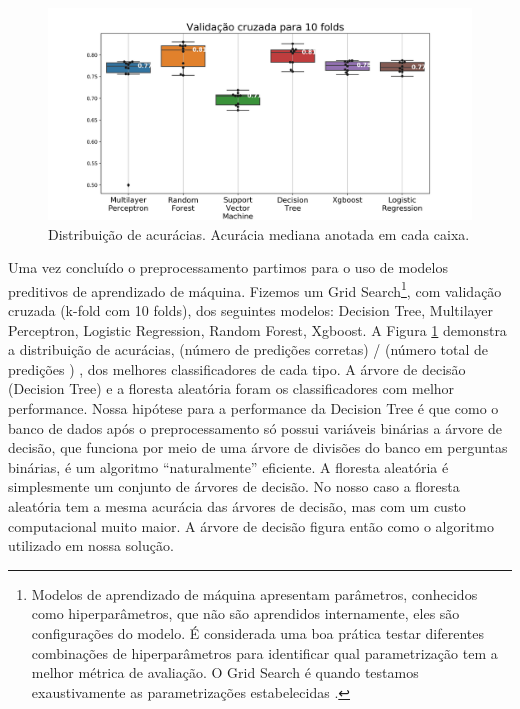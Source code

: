 \documentclass[
	12pt,				%
	openany,			%
	oneside,			%
	a4paper,			%
	english,			%
	french,				%
	spanish,			%
	brazil,				%
	]{abntex2}
\begin{document}
\begin{figure}[H]
  \includegraphics[scale=0.5]{img/cvs.png}
  \caption{Distribuição de acurácias. Acurácia mediana anotada em cada caixa.}
  \label{ref:figaccs}
\end{figure}

Uma vez concluído o preprocessamento partimos para o uso de modelos preditivos
de aprendizado de máquina. Fizemos um Grid Search\footnote{Modelos de
  aprendizado de máquina apresentam parâmetros, conhecidos como hiperparâmetros,
  que não são aprendidos internamente, eles são configura\c{c}ões do modelo. É
  considerada uma boa prática testar diferentes combinações de hiperparâmetros
  para identificar qual parametrização tem a melhor métrica de avaliação. O Grid
  Search é quando testamos exaustivamente as parametrizações estabelecidas
  \cite{geron2019hands}. }, com validação cruzada (k-fold com 10 folds), dos
seguintes modelos: Decision Tree, Multilayer Perceptron, Logistic Regression,
Random Forest, Xgboost. A Figura \ref{ref:figaccs} demonstra a distribuição de
acurácias, (número de predições corretas) / (número total de predições ) , dos
melhores classificadores de cada tipo. A árvore de decisão (Decision Tree) e a
floresta aleatória foram os classificadores com melhor performance. Nossa
hipótese para a performance da Decision Tree é que como o banco de dados após o
preprocessamento só possui variáveis binárias a árvore de decisão, que funciona
por meio de uma árvore de divisões do banco em perguntas binárias, é um
algoritmo ``naturalmente'' eficiente. A floresta aleatória é simplesmente um
conjunto de árvores de decisão. No nosso caso a floresta aleatória tem a mesma
acurácia das árvores de decisão, mas com um custo computacional muito maior. A
árvore de decisão figura então como o algoritmo utilizado em nossa solu\c{c}ão.
\end{document}

